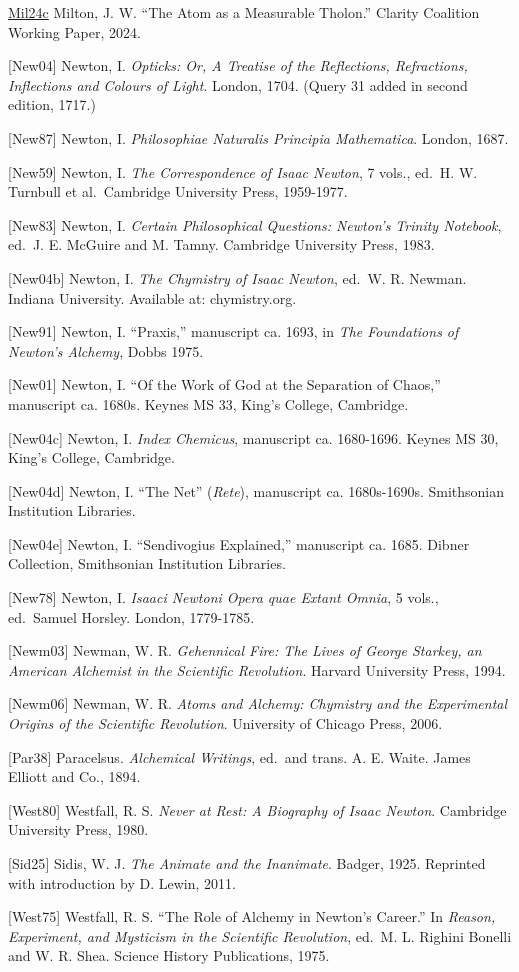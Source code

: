 \documentclass[12pt]{article}
\begin{document}
\href{https://github.com/baardev/truevalue/blob/main/docnav/Research/papers/8_atom-as-tholon-measurable-phenomena/8_atom-as-tholon-measurable-phenomena.pdf}{Mil24c}
Milton, J. W. ``The Atom as a Measurable Tholon.'' Clarity Coalition
Working Paper, 2024.

{[}New04{]} Newton, I. \emph{Opticks: Or, A Treatise of the Reflections,
Refractions, Inflections and Colours of Light}. London, 1704. (Query 31
added in second edition, 1717.)

{[}New87{]} Newton, I. \emph{Philosophiae Naturalis Principia
Mathematica}. London, 1687.

{[}New59{]} Newton, I. \emph{The Correspondence of Isaac Newton}, 7
vols., ed.~H. W. Turnbull et al.~Cambridge University Press, 1959-1977.

{[}New83{]} Newton, I. \emph{Certain Philosophical Questions: Newton's
Trinity Notebook}, ed.~J. E. McGuire and M. Tamny. Cambridge University
Press, 1983.

{[}New04b{]} Newton, I. \emph{The Chymistry of Isaac Newton}, ed.~W. R.
Newman. Indiana University. Available at: chymistry.org.

{[}New91{]} Newton, I. ``Praxis,'' manuscript ca. 1693, in \emph{The
Foundations of Newton's Alchemy}, Dobbs 1975.

{[}New01{]} Newton, I. ``Of the Work of God at the Separation of
Chaos,'' manuscript ca. 1680s. Keynes MS 33, King's College, Cambridge.

{[}New04c{]} Newton, I. \emph{Index Chemicus}, manuscript ca. 1680-1696.
Keynes MS 30, King's College, Cambridge.

{[}New04d{]} Newton, I. ``The Net'' (\emph{Rete}), manuscript ca.
1680s-1690s. Smithsonian Institution Libraries.

{[}New04e{]} Newton, I. ``Sendivogius Explained,'' manuscript ca. 1685.
Dibner Collection, Smithsonian Institution Libraries.

{[}New78{]} Newton, I. \emph{Isaaci Newtoni Opera quae Extant Omnia}, 5
vols., ed.~Samuel Horsley. London, 1779-1785.

{[}Newm03{]} Newman, W. R. \emph{Gehennical Fire: The Lives of George
Starkey, an American Alchemist in the Scientific Revolution}. Harvard
University Press, 1994.

{[}Newm06{]} Newman, W. R. \emph{Atoms and Alchemy: Chymistry and the
Experimental Origins of the Scientific Revolution}. University of
Chicago Press, 2006.

{[}Par38{]} Paracelsus. \emph{Alchemical Writings}, ed.~and trans. A. E.
Waite. James Elliott and Co., 1894.

{[}West80{]} Westfall, R. S. \emph{Never at Rest: A Biography of Isaac
Newton}. Cambridge University Press, 1980.

{[}Sid25{]} Sidis, W. J. \emph{The Animate and the Inanimate}. Badger,
1925. Reprinted with introduction by D. Lewin, 2011.

{[}West75{]} Westfall, R. S. ``The Role of Alchemy in Newton's Career.''
In \emph{Reason, Experiment, and Mysticism in the Scientific
Revolution}, ed.~M. L. Righini Bonelli and W. R. Shea. Science History
Publications, 1975.
\end{document}
